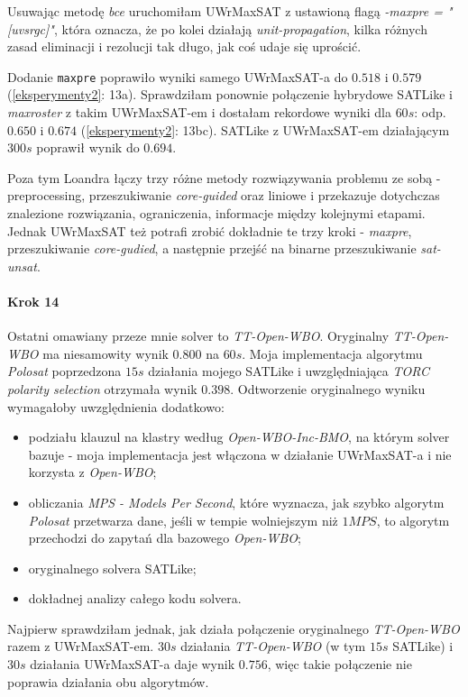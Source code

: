 \documentclass[shortabstract]{iithesis}
\begin{document}
Usuwając metodę \textit{bce} uruchomiłam UWrMaxSAT z ustawioną flagą \textit{-maxpre = "[uvsrgc]"}, która oznacza, że po kolei działają \textit{unit-propagation}, kilka różnych zasad eliminacji i rezolucji \cite{maxpre} tak długo, jak coś udaje się uprościć.

Dodanie \texttt{maxpre} poprawiło wyniki samego UWrMaxSAT-a do $0.518$ i $0.579$
(\ref{eksperymenty2}: 13a). 
Sprawdziłam ponownie połączenie hybrydowe SATLike i \textit{maxroster} z takim UWrMaxSAT-em i dostałam rekordowe wyniki dla $60s$: odp. $0.650$ i $0.674$ (\ref{eksperymenty2}: 13bc). SATLike z UWrMaxSAT-em działającym $300s$ poprawił wynik do $0.694$.

Poza tym Loandra łączy trzy różne metody rozwiązywania problemu ze sobą - preprocessing, przeszukiwanie \textit{core-guided} oraz liniowe i przekazuje dotychczas znalezione rozwiązania, ograniczenia, informacje między kolejnymi etapami. Jednak UWrMaxSAT też potrafi zrobić dokładnie te trzy kroki - \textit{maxpre}, przeszukiwanie \textit{core-gudied}, a następnie przejść na binarne przeszukiwanie \textit{sat-unsat}.

\paragraph{Krok 14}
Ostatni omawiany przeze mnie solver to \textit{TT-Open-WBO}.
Oryginalny \textit{TT-Open-WBO} ma niesamowity wynik $0.800$ na $60s$. Moja implementacja algorytmu \textit{Polosat} poprzedzona $15s$ działania mojego SATLike i uwzględniająca \textit{TORC polarity selection} otrzymała wynik $0.398$. Odtworzenie oryginalnego wyniku wymagałoby uwzględnienia dodatkowo:
\begin{itemize}
	\item podziału klauzul na klastry według \textit{Open-WBO-Inc-BMO}, na którym solver bazuje - moja implementacja jest włączona w działanie UWrMaxSAT-a i nie korzysta z \textit{Open-WBO};
	\item obliczania \textit{MPS - Models Per Second}, które wyznacza, jak szybko algorytm \textit{Polosat} przetwarza dane, jeśli w tempie wolniejszym niż $1 MPS$, to algorytm przechodzi do zapytań dla bazowego \textit{Open-WBO};
	\item oryginalnego solvera SATLike;
	\item dokładnej analizy całego kodu solvera.
\end{itemize}

Najpierw sprawdziłam jednak, jak działa połączenie oryginalnego \textit{TT-Open-WBO} razem z UWrMaxSAT-em. $30s$ działania \textit{TT-Open-WBO} (w tym $15s$ SATLike) i $30s$ działania UWrMaxSAT-a daje wynik $0.756$, więc takie połączenie nie poprawia działania obu algorytmów.
\end{document}
